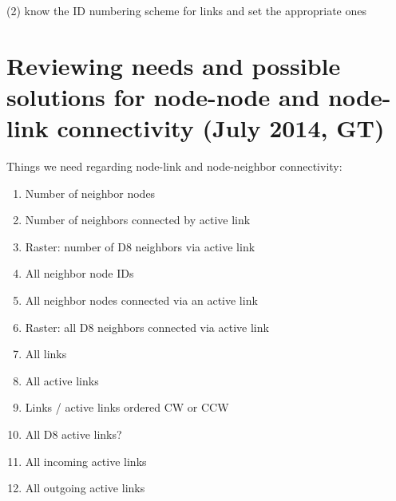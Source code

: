 \documentclass[12pt]{amsart}
\begin{document}
(2) know the ID numbering scheme for links and set the appropriate ones

	
\section{Reviewing needs and possible solutions for node-node and node-link connectivity (July 2014, GT)}

Things we need regarding node-link and node-neighbor connectivity:

\begin{enumerate}
\item
Number of neighbor nodes
\item
Number of neighbors connected by active link
\item
Raster: number of D8 neighbors via active link
\item
All neighbor node IDs
\item
All neighbor nodes connected via an active link
\item
Raster: all D8 neighbors connected via active link
\item
All links
\item
All active links
\item
Links / active links ordered CW or CCW
\item
All D8 active links?
\item
All incoming active links
\item 
All outgoing active links
\end{enumerate}


			
\end{document}

